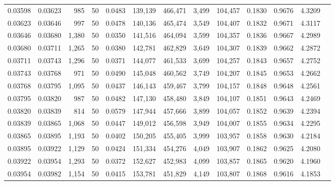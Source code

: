 \begin{tabular}{rrrrrrrrrrrrr}
0.03598 & 0.03623 &   985 &  50 &                                     0.0483 & 139,139 & 466,471 &   3,499 & 104,457 & 0.1830 & 0.9676 & 4.3209 \\
0.03623 & 0.03646 &   997 &  50 &                                     0.0478 & 140,136 & 465,474 &   3,549 & 104,407 & 0.1832 & 0.9671 & 4.3117 \\
0.03646 & 0.03680 & 1,380 &  50 &                                     0.0350 & 141,516 & 464,094 &   3,599 & 104,357 & 0.1836 & 0.9667 & 4.2989 \\
0.03680 & 0.03711 & 1,265 &  50 &                                     0.0380 & 142,781 & 462,829 &   3,649 & 104,307 & 0.1839 & 0.9662 & 4.2872 \\
0.03711 & 0.03743 & 1,296 &  50 &                                     0.0371 & 144,077 & 461,533 &   3,699 & 104,257 & 0.1843 & 0.9657 & 4.2752 \\
0.03743 & 0.03768 &   971 &  50 &                                     0.0490 & 145,048 & 460,562 &   3,749 & 104,207 & 0.1845 & 0.9653 & 4.2662 \\
0.03768 & 0.03795 & 1,095 &  50 &                                     0.0437 & 146,143 & 459,467 &   3,799 & 104,157 & 0.1848 & 0.9648 & 4.2561 \\
0.03795 & 0.03820 &   987 &  50 &                                     0.0482 & 147,130 & 458,480 &   3,849 & 104,107 & 0.1851 & 0.9643 & 4.2469 \\
0.03820 & 0.03839 &   814 &  50 &                                     0.0579 & 147,944 & 457,666 &   3,899 & 104,057 & 0.1852 & 0.9639 & 4.2394 \\
0.03839 & 0.03865 & 1,068 &  50 &                                     0.0447 & 149,012 & 456,598 &   3,949 & 104,007 & 0.1855 & 0.9634 & 4.2295 \\
0.03865 & 0.03895 & 1,193 &  50 &                                     0.0402 & 150,205 & 455,405 &   3,999 & 103,957 & 0.1858 & 0.9630 & 4.2184 \\
0.03895 & 0.03922 & 1,129 &  50 &                                     0.0424 & 151,334 & 454,276 &   4,049 & 103,907 & 0.1862 & 0.9625 & 4.2080 \\
0.03922 & 0.03954 & 1,293 &  50 &                                     0.0372 & 152,627 & 452,983 &   4,099 & 103,857 & 0.1865 & 0.9620 & 4.1960 \\
0.03954 & 0.03982 & 1,154 &  50 &                                     0.0415 & 153,781 & 451,829 &   4,149 & 103,807 & 0.1868 & 0.9616 & 4.1853 \\

\end{tabular}
